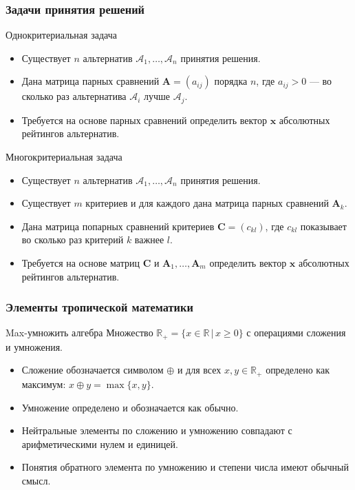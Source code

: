 \documentclass[ucs, notheorems, handout]{beamer}
\begin{document}
\begin{frame}
    \frametitle{Задачи принятия решений}
    \begin{block}{Однокритериальная задача}
        \begin{itemize}
            \item Существует $n$ альтернатив $\mathcal{A}_{1},\ldots,\mathcal{A}_{n}$ принятия решения.
            \item Дана матрица парных сравнений $\bm{A}=(a_{ij})$ порядка $n$, где $a_{ij}>0$  ---  во сколько раз альтернатива $\mathcal{A}_{i}$ лучше $\mathcal{A}_{j}$.
            \item Требуется на основе парных сравнений определить вектор $\bm{x}$ абсолютных рейтингов альтернатив.
        \end{itemize}
    \end{block}

    \begin{block}{Многокритериальная задача}
        \begin{itemize}
            \item Существует $n$ альтернатив $\mathcal{A}_{1},\ldots,\mathcal{A}_{n}$ принятия решения.
            \item Существует $m$ критериев и для каждого дана матрица парных сравнений $\bm{A}_{k}$.
            \item Дана матрица попарных сравнений критериев $\bm{C}=(c_{kl})$, где $c_{kl}$ показывает во сколько раз критерий $k$ важнее $l$.
            \item Требуется на основе матриц $\bm{C}$ и $\bm{A}_{1},\ldots,\bm{A}_{m}$ определить вектор $\bm{x}$ абсолютных рейтингов альтернатив.
        \end{itemize}
    \end{block}
\end{frame}

\begin{frame}
    \frametitle{Элементы тропической математики}
    \begin{block}{Max-умножить алгебра}
        Множество $\mathbb{R}_+ = \{x \in \mathbb{R} \, |\, x \geq 0\}$ с операциями сложения и умножения.
    \end{block}
    \begin{itemize}
        \item Сложение обозначается символом $\oplus$ и для всех $x,y\in\mathbb{R}_{+}$ определено как максимум: $x\oplus y=\max\{x,y\}$.
        \item Умножение определено и обозначается как обычно.
        \item Нейтральные элементы по сложению и умножению совпадают с арифметическими нулем и единицей.
        \item Понятия обратного элемента по умножению и степени числа имеют обычный смысл. 
    \end{itemize}
\end{frame}
\end{document}
